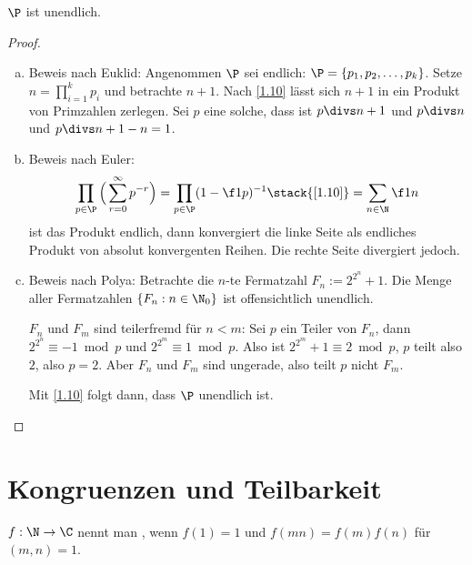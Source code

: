 \begin{st}
	$\P$ ist unendlich.
	\begin{proof}
		\begin{enumerate}[a)]
			\item
				Beweis nach Euklid:
				Angenommen $\P$ sei endlich: $\P = \{p_1, p_2, \dotsc, p_k\}$.
				Setze $n = \prod_{i=1}^k p_i$ und betrachte $n + 1$.
				Nach \ref{1.10} lässt sich $n +1$ in ein Produkt von Primzahlen zerlegen.
				Sei $p$ eine solche, dass ist $p \divs n + 1$ und $p \divs  n$ und $p \divs  n + 1 - n = 1$.
			\item
				Beweis nach Euler:
				\[
					\prod_{p\in \P} \Big( \sum_{r=0}^\infty p^{-r} \Big)
					= \prod_{p\in \P} (1 - \f 1p)^{-1}
					\stack{\ref{1.10}}= \sum_{n\in \N} \f 1n
				\]
				ist das Produkt endlich, dann konvergiert die linke Seite als endliches Produkt von absolut konvergenten Reihen.
				Die rechte Seite divergiert jedoch.
			\item
				Beweis nach Polya:
				Betrachte die $n$-te Fermatzahl $F_n := 2^{2^n} + 1$.
				Die Menge aller Fermatzahlen $\{F_n : n \in \N_0\}$ ist offensichtlich unendlich.

				$F_n$ und $F_m$ sind teilerfremd für $n < m$:
				Sei $p$ ein Teiler von $F_n$, dann $2^{2^n} \equiv -1 \bmod p$ und $2^{2^m} \equiv 1 \bmod p$.
				Also ist $2^{2^m} + 1 \equiv 2 \bmod p$, $p$ teilt also $2$, also $p = 2$.
				Aber $F_n$ und $F_m$ sind ungerade, also teilt $p$ nicht $F_m$.

				Mit \ref{1.10} folgt dann, dass $\P$ unendlich ist.
		\end{enumerate}
	\end{proof}
\end{st}

\section{Kongruenzen und Teilbarkeit}

\begin{df*}
	$f: \N \to \C$ nennt man , wenn $f(1) = 1$ und $f(m n) = f(m) f(n)$ für $(m,n) = 1$.
\end{df*}

